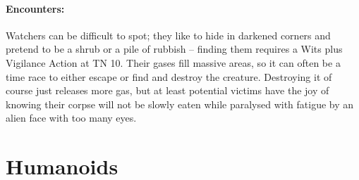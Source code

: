 \begin{multicols}{2}
\paragraph{Encounters:} Watchers can be difficult to spot; they like to hide in darkened corners and pretend to be a shrub or a pile of rubbish -- finding them requires a Wits plus Vigilance Action at TN 10.
Their gases fill massive areas, so it can often be a time race to either escape or find and destroy the creature.
Destroying it of course just releases more gas, but at least potential victims have the joy of knowing their corpse will not be slowly eaten while paralysed with fatigue by an alien face with too many eyes.

\watcher

\end{multicols}

\section{Humanoids}

